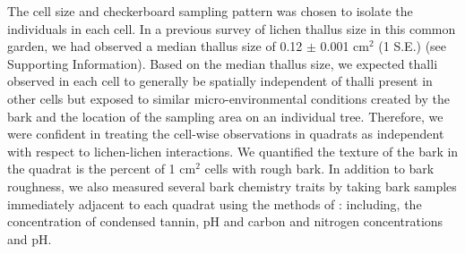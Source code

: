 \documentclass[11pt,twocolumn,twoside,lineno]{pnas-new}
\begin{document}
{The cell size and checkerboard sampling pattern was chosen to isolate
the individuals in each cell. In a previous survey of lichen thallus
size in this common garden, we had observed a median thallus size of
0.12 $\pm$ 0.001 cm$^2$ (1 S.E.) (see Supporting Information). Based
on the median thallus size, we expected thalli observed in each cell
to generally be spatially independent of thalli present in other cells
but exposed to similar micro-environmental conditions created by the
bark and the location of the sampling area on an individual
tree. Therefore, we were confident in treating the cell-wise
observations in quadrats as independent with respect to lichen-lichen
interactions. We quantified the texture of the bark in the quadrat is
the percent of 1 cm$^2$ cells with rough bark. In addition to bark
roughness, we also measured several bark chemistry traits by taking
bark samples immediately adjacent to each quadrat using the methods of
\citep{Lamit2011}: including, the concentration of condensed tannin,
pH and carbon and nitrogen concentrations and pH.

}
\end{document}
